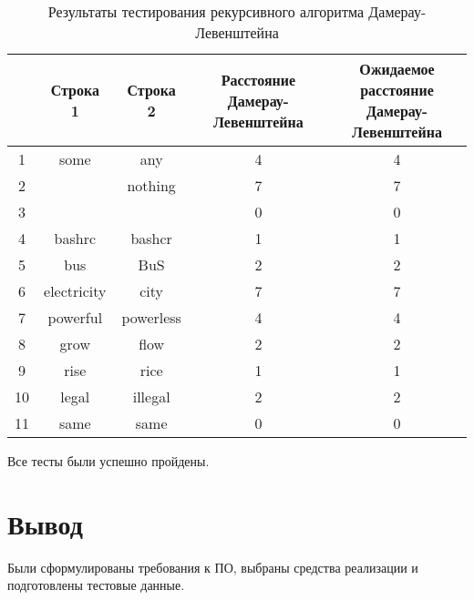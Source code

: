 \begin{table}[H]
    \caption{Результаты тестирования рекурсивного алгоритма Дамерау-Левенштейна}
	\begin{tabular}{|c|c|c|c|c|}
 	\hline
    \No{} & Строка 1 & Строка 2 & \makecell{Расстояние\\Дамерау-Левенштейна} & \makecell{Ожидаемое расстояние\\Дамерау-Левенштейна} \\
 	\hline
 	1 & some & any & 4 & 4\\
 	\hline
 	2 & & nothing & 7 & 7\\
 	\hline
 	3 & & & 0 & 0\\
 	\hline
 	4 & bashrc & bashcr & 1 & 1\\
 	\hline
 	5 & bus & BuS & 2 & 2\\
 	\hline
 	6 & electricity & city & 7 & 7\\
 	\hline
 	7 & powerful & powerless & 4 & 4\\
 	\hline
 	8 & grow & flow & 2 & 2\\
 	\hline
 	9 & rise & rice & 1 & 1\\
 	\hline
    10 & legal & illegal & 2 & 2\\
 	\hline
    11 & same & same & 0 & 0\\
    \hline
	\end{tabular}
\end{table}

Все тесты были успешно пройдены.
\section{Вывод}

Были сформулированы требования к ПО, выбраны средства реализации и подготовлены тестовые данные.
